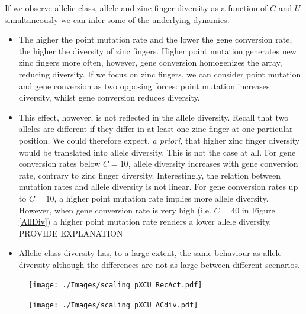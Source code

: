 \documentclass[a4paper,10pt]{article}
\begin{document}
If we observe allelic class, allele and zinc finger diversity as a function of $C$ and $U$ simultaneously we can infer some of the underlying dynamics.
\begin{itemize}
 \item The higher the point mutation rate and the lower the gene conversion rate, the higher the diversity of zinc fingers. Higher point mutation generates new zinc fingers more often, however, gene conversion homogenizes the array, reducing diversity. If we focus on zinc fingers, we can consider point mutation and gene conversion as two opposing forces: point mutation increases diversity, whilst gene conversion reduces diversity. 
 \item This effect, however, is not reflected in the allele diversity. Recall that two alleles are different if they differ in at least one zinc finger at one particular position. We could therefore expect, \textit{a priori}, that higher zinc finger diversity would be translated into allele diversity. This is not the case at all. For gene conversion rates below $C=10$, allele diversity increases with gene conversion rate, contrary to zinc finger diversity. 
 Interestingly, the relation between mutation rates and allele diversity is not linear. For gene conversion rates up to $C=10$, a higher point mutation rate implies more allele diversity. However, when gene conversion rate is very high (i.e. $C=40$ in Figure \ref{AllDiv}) a higher point mutation rate renders a lower allele diversity. 
 PROVIDE EXPLANATION
 \item Allelic class diversity has, to a large extent, the same behaviour as allele diversity although the differences are not as large between different scenarios. 

 \end{itemize}






 

\begin{figure}[htb]
\begin{center}
\leavevmode
\texttt{[image: ./Images/scaling\_pXCU\_RecAct.pdf]}
\end{center}
\caption{\small{}}
\label{RecAct_scaling}
\end{figure}

\begin{figure}[htb]
\begin{center}
\leavevmode
\texttt{[image: ./Images/scaling\_pXCU\_ACdiv.pdf]}
\end{center}
\caption{\small{}}
\label{ACdiv_scaling}
\end{figure}
\end{document}
